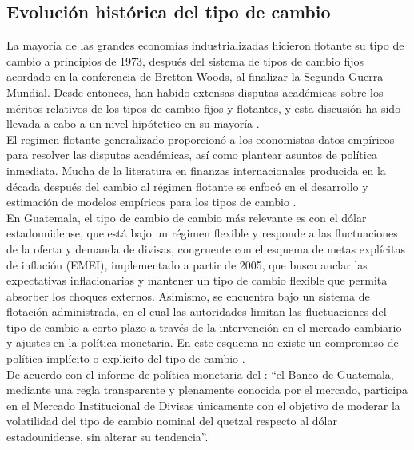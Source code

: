 	\subsection{Evolución histórica del tipo de cambio}
	
	La mayoría de las grandes economías industrializadas hicieron flotante su tipo de cambio a principios de 1973, después del sistema de tipos de cambio fijos acordado en la conferencia de Bretton Woods, al finalizar la Segunda Guerra Mundial. Desde entonces, han habido extensas disputas académicas sobre los méritos relativos de los tipos de cambio fijos y flotantes, y esta discusión ha sido llevada a cabo a un nivel hipótetico en su mayoría \parencite{frankelrose1994survey}.\\
	
	El regimen flotante generalizado proporcionó a los economistas datos empíricos para resolver las disputas académicas, así como plantear asuntos de política inmediata. Mucha de la literatura en finanzas internacionales producida en la década después del cambio al régimen flotante se enfocó en el desarrollo y estimación de modelos empíricos para los tipos de cambio \parencite{frankelrose1994survey}.\\
	
	
	
	En Guatemala, el tipo de cambio de cambio más relevante es con el dólar estadounidense, que está bajo un régimen flexible y responde a las fluctuaciones de la oferta y demanda de divisas, congruente con el esquema de metas explícitas de inflación (EMEI), implementado a partir de 2005, que busca anclar las expectativas inflacionarias y mantener un tipo de cambio flexible que permita absorber los choques externos. Asimismo, se encuentra bajo un sistema de flotación administrada, en el cual las autoridades limitan las fluctuaciones del tipo de cambio a corto plazo a través de la intervención en el mercado cambiario y ajustes en la política monetaria. En este esquema no existe un compromiso de política implícito o explícito del tipo de cambio \parencite{banguatregime}.\\
	
	De acuerdo con el informe de política monetaria del \textcite{banguatpolmonet}: ``el Banco de Guatemala, mediante una regla transparente y plenamente conocida por el mercado, participa en el Mercado Institucional de Divisas únicamente con el objetivo de moderar la volatilidad del tipo de cambio nominal del quetzal respecto al dólar estadounidense, sin alterar su tendencia''.

